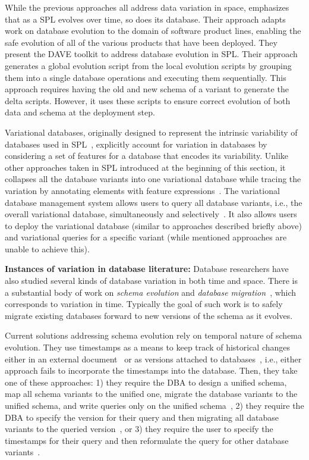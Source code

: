 While the previous approaches all address data variation in space, 
\citet{dbSPLevolve} emphasizes that as a SPL evolves over time, so does its
database. Their approach adapts work on database evolution to the
domain of software product lines, enabling the safe evolution of all of the
various products that have been deployed.
%
 They present the DAVE toolkit to address database evolution in SPL. Their
 approach generates a global evolution script from the local evolution scripts
 by grouping them into a single database operations and executing them
 sequentially. This approach requires having the old and new schema of a
 variant to generate the delta scripts. However, it uses these scripts to
 ensure correct evolution of both data and schema at the deployment step. 

 Variational databases, originally designed to represent the intrinsic
 variability of databases used in SPL~\cite{ATW18poly}, explicitly account for
 variation in databases by considering a set of features for a database that
 encodes its variability. Unlike other approaches taken in SPL introduced at
 the beginning of this section, it collapses all the database variants into
 one variational database while tracing the variation by annotating elements
 with feature expressions~\cite{ATW17dbpl}. The variational database
 management system allows users to query all database variants, i.e., the
 overall variational database, simultaneously and
 selectively~\cite{vldbArXiv}. It also allows users to deploy the variational
 database (similar to approaches described briefly above) and variational
 queries for a specific variant (while mentioned approaches are unable to
 achieve this).

\textbf{Instances of variation in database literature:}
Database researchers have also studied several kinds of database variation in
both time and space. There is a substantial body of work on \emph{schema
evolution} and \emph{database
migration}~\cite{Prism08Curino,prima08Moon,schEvolUnifyApp,schEvolIssues03Ram},
which corresponds to variation in time. Typically the goal of such work is to
safely migrate existing databases forward to new versions of the schema as it
evolves. 

Current solutions addressing schema evolution rely on
temporal nature of schema evolution. They use timestamps as a 
means to keep track of historical changes either in an external document~\cite{prima08Moon}
or as versions attached to 
databases~\cite{SchEvolRA90McKenzie, schVersioning97Castro, tempSchEvol91Ariav, tsql95Snodgrass}, 
i.e., either approach fails to incorporate
the timestamps into the database. 
Then, they take one of these approaches:
1) they require the DBA to design a unified schema, map all schema variants
to the unified one, migrate the database variants to the unified schema, and
write queries only on the unified schema~\cite{schEvolUnifyApp},
2) they require the DBA to specify the version for their query and then migrating
all database variants to the queried 
version~\cite{SchEvolRA90McKenzie, schVersioning97Castro, tempSchEvol91Ariav, tsql95Snodgrass},
or 3) they require the user to specify the timestamps for their query and
then reformulate the query for other database variants~\cite{prima08Moon}.

